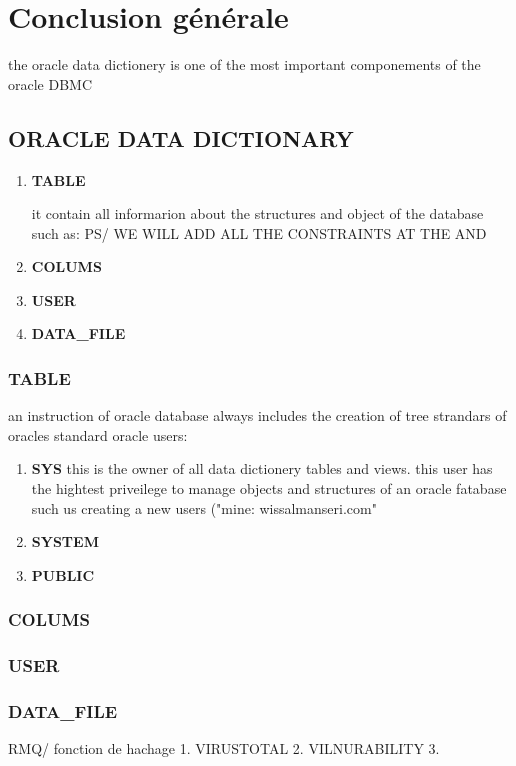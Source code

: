 \chapter*{Conclusion générale}
\par the oracle data dictionery is one of the most
important componements of the oracle DBMC
\section{ORACLE DATA DICTIONARY}
\begin{enumerate}
    \item [\textbullet]\textbf{TABLE}
    \par it contain all informarion about the structures and object of the database such as:
    PS/ WE WILL ADD ALL THE CONSTRAINTS AT THE AND
    \item [\textbullet]\textbf{COLUMS}
    \item [\textbullet]\textbf{USER}
    \item [\textbullet]\textbf{DATA_FILE}
\end{enumerate}
\subsection{TABLE}
\par an instruction of oracle database always includes the creation of tree strandars of oracles standard oracle users:
\begin{enumerate}
    \item [\textbullet]\textbf{SYS} this is the owner of all data dictionery tables and views. this user has the hightest priveilege to manage objects and structures of an oracle fatabase such us creating a new users ("mine: wissalmanseri\@gmail.com"
    \item [\textbullet]\textbf{SYSTEM}
    \item [\textbullet]\textbf{PUBLIC}
\end{enumerate}
\subsection{COLUMS}
\subsection{USER}
\subsection{DATA_FILE}
\par RMQ/ fonction de hachage
1. VIRUSTOTAL
2. VILNURABILITY 
3.